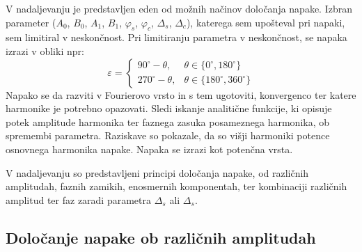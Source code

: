 \documentclass[a4paper]{article}
\begin{document}
V nadaljevanju je predstavljen eden od možnih načinov določanja napake. Izbran parameter ($A_0$, $B_0$, $A_1$, $B_1$, $\varphi_{s}$, $\varphi_{c}$, $\Delta_s$, $\Delta_c$), katerega sem upošteval pri napaki, sem limitiral v neskončnost. Pri limitiranju parametra v neskončnost, se napaka izrazi v obliki npr:
\begin{equation}
\label{equ:def_err_inf}
\varepsilon=
\begin{cases}
90^\circ-\theta, & \theta \in \{0^\circ,180^\circ\}\\
270^\circ-\theta, & \theta \in \{180^\circ,360^\circ\}
\end{cases}
\end{equation}
Napako se da razviti v Fourierovo vrsto \cite{fourier} in s tem ugotoviti, konvergenco ter katere harmonike je potrebno opazovati. Sledi iskanje analitične funkcije, ki opisuje potek amplitude harmonika ter faznega zasuka posameznega harmonika, ob spremembi parametra. Raziskave so pokazale, da so višji harmoniki potence osnovnega harmonika napake. Napaka se izrazi kot potenčna vrsta.

V nadaljevanju so predstavljeni principi določanja napake, od različnih amplitudah, faznih zamikih, enosmernih komponentah, ter kombinaciji različnih amplitud ter faz zaradi parametra $\Delta_s$ ali $\Delta_s$.

\subsection{Določanje napake ob različnih amplitudah}
\end{document}
